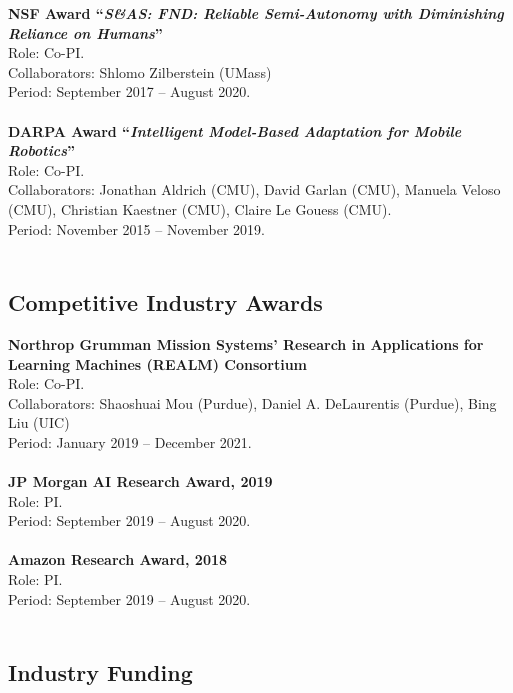 \documentclass[Times]{article}
\newcommand{\funding}[1]{#1\\}
\renewcommand{\funding}[1]{\\}
\begin{document}
\textbf{NSF Award ``\emph{S\&AS: FND: Reliable Semi-Autonomy with Diminishing Reliance
on Humans}''}\\
Role: Co-PI.\\
Collaborators: Shlomo Zilberstein (UMass)\\
Period: September 2017 -- August 2020.\\
\funding{Total funding: \$699,512.}

\textbf{DARPA Award ``\emph{Intelligent Model-Based Adaptation for Mobile
  Robotics}''}\\
Role: Co-PI.\\
Collaborators: Jonathan Aldrich (CMU), David Garlan (CMU), Manuela Veloso
(CMU), Christian Kaestner (CMU), Claire Le Gouess (CMU).\\
Period: November 2015 -- November 2019.\\
\funding{PI Biswas' share: \$377,019.}

\vspace{-1.5em}
\subsection*{Competitive Industry Awards}

\textbf{Northrop Grumman Mission Systems’ Research in Applications for Learning Machines (REALM) Consortium}\\
Role: Co-PI.\\
Collaborators: Shaoshuai Mou (Purdue), Daniel A. DeLaurentis (Purdue), Bing Liu (UIC)\\
Period: January 2019 -- December 2021.\\
\funding{Total funding: \$1,200,000. PI Biswas' share: \$302,668}

\textbf{JP Morgan AI Research Award, 2019}\\
Role: PI.\\
Period: September 2019 -- August 2020.\\
\funding{Amount: \$147,424.}

\textbf{Amazon Research Award, 2018}\\
Role: PI.\\
Period: September 2019 -- August 2020.\\
\funding{Amount: \$80,000.}

\vspace{-1.5em}
\subsection*{Industry Funding}
\end{document}
